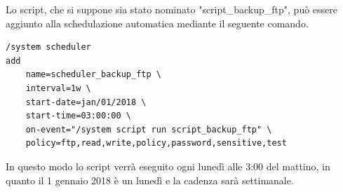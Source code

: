 \documentclass[Tesi.tex]{subfiles}
\begin{document}
Lo script, che si suppone sia stato nominato "script\_backup\_ftp", può essere aggiunto alla schedulazione automatica mediante il seguente comando. \\

\begin{lstlisting}[caption=Comando per la schedulazione del backup]
/system scheduler
add
	name=scheduler_backup_ftp \
	interval=1w \
	start-date=jan/01/2018 \
	start-time=03:00:00 \
	on-event="/system script run script_backup_ftp" \
	policy=ftp,read,write,policy,password,sensitive,test
\end{lstlisting}

In questo modo lo script verrà eseguito ogni lunedì alle 3:00 del mattino, in quanto il 1 gennaio 2018 è un lunedì e la cadenza sarà settimanale.
\end{document}

